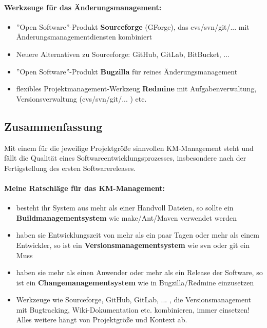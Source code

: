 \paragraph{Werkzeuge für das Änderungsmanagement:}
\begin{itemize}
	\item ''Open Software''-Produkt \textbf{Sourceforge} (GForge), das cvs/svn/git/... mit Änderungsmanagementdiensten kombiniert
	\item Neuere Alternativen zu Sourceforge: GitHub, GitLab, BitBucket, ... 
	\item ''Open Software''-Produkt \textbf{Bugzilla} für reines Änderungsmanagement 
	\item flexibles Projektmanagement-Werkzeug \textbf{Redmine} mit Aufgabenverwaltung, Versionsverwaltung (cvs/svn/git/... ) etc.
\end{itemize}

\subsection{Zusammenfassung}
Mit einem für die jeweilige Projektgröße sinnvollen KM-Management steht und fällt die Qualität eines Softwareentwicklungsprozesses, insbesondere nach der Fertigstellung des ersten Softwarereleases. 
\paragraph{Meine Ratschläge für das KM-Management:}
\begin{itemize}
	\item besteht ihr System aus mehr als einer Handvoll Dateien, so sollte ein \textbf{Buildmanagementsystem} wie make/Ant/Maven verwendet werden
	\item haben sie Entwicklungszeit von mehr als ein paar Tagen oder mehr als einem Entwickler, so ist ein \textbf{Versionsmanagementsystem} wie svn oder git ein Muss
	\item haben sie mehr als einen Anwender oder mehr als ein Release der Software, so ist ein \textbf{Changemanagementsystem} wie in Bugzilla/Redmine einzusetzen
	\item Werkzeuge wie Sourceforge, GitHub, GitLab, ... , die Versionsmanagement mit Bugtracking, Wiki-Dokumentation etc. kombinieren, immer einsetzen! Alles weitere hängt von Projektgröße und Kontext ab.
\end{itemize}



